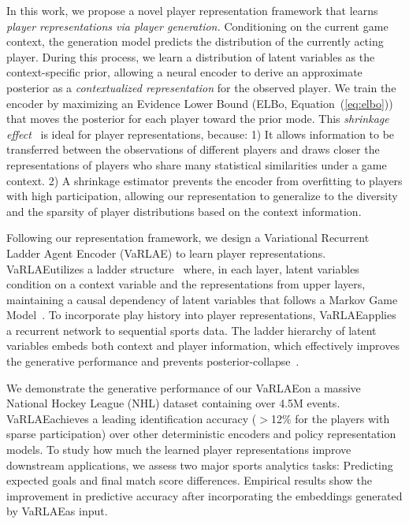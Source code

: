 \documentclass[letterpaper]{article} %
\newcommand{\system}{VaRLAE\;}
\begin{document}
In this work, we propose a novel player representation framework that learns {\em player representations via player generation.} Conditioning on the current game context, the generation model predicts the distribution of the currently acting player. During this process, we learn a distribution of latent variables as the context-specific prior, allowing a neural encoder to derive an approximate posterior as a {\it contextualized representation} for the observed player. We train the encoder by maximizing an Evidence Lower Bound (ELBo, Equation~(\ref{eq:elbo})) that moves the posterior for each player toward the prior mode. This {\em shrinkage effect}~\cite{kruschke2014doing} is ideal for player representations, because: 1) It allows information to be transferred between the observations of different players and draws closer the representations of players who share many statistical similarities under a game context. 2) A shrinkage estimator prevents the encoder from overfitting to players with high participation, allowing our representation to generalize to the diversity and the sparsity of player distributions based on the context information.

Following our representation framework, we design a Variational Recurrent Ladder Agent Encoder (VaRLAE) to learn player representations. \system utilizes a ladder structure~\cite{SonderbyLadderVAE16} where, in each layer, latent variables condition on a context variable and the representations from upper layers, maintaining a causal dependency of latent variables that follows a Markov Game Model~\cite{Littman1994}. To incorporate play history into player representations, \system applies a recurrent network  %
to sequential sports data.
The ladder hierarchy of latent variables embeds both context and player information, which effectively improves the generative performance and prevents posterior-collapse~\cite{SonderbyLadderVAE16,HePosteriorCollapse19}.

We demonstrate the generative performance of our \system on a massive National Hockey League (NHL) dataset containing over 4.5M events. \system achieves a leading identification accuracy ($>$12\% for the players with sparse participation) over other deterministic encoders and policy representation models. 
To study how much the learned player representations improve downstream applications, we assess two major sports analytics tasks: Predicting expected goals and final match score differences. 
Empirical results show the improvement in predictive accuracy after incorporating the embeddings generated by \system as input. 
\end{document}
